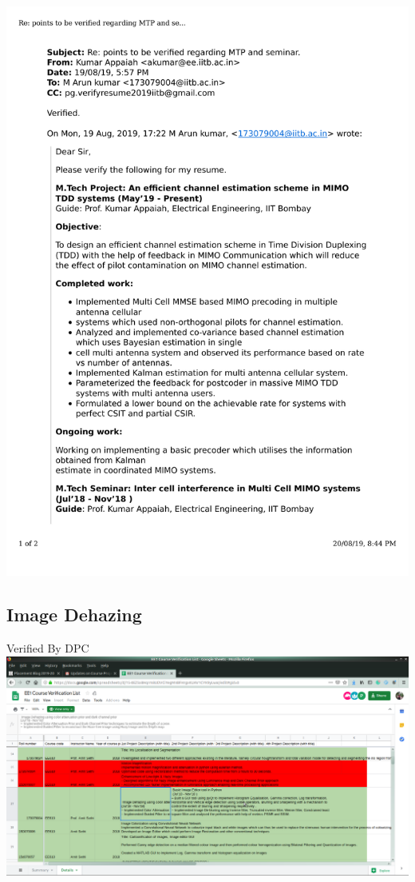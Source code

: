 \documentclass{article}
\begin{document}
		\includegraphics[page=2, scale=0.5]{proofs/mtp.pdf}
	\subsection{Image Dehazing}
		Verified By DPC\\
		\includegraphics[page=1, scale=0.25]{proofs/image_processing.png}
\end{document}
